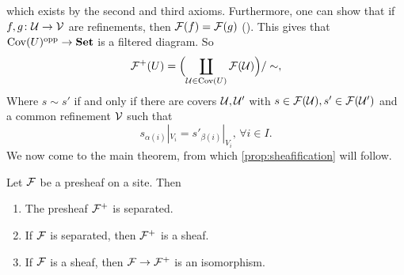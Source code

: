 \documentclass{article}
\DeclareMathOperator{\opp}{opp}
\DeclareMathOperator{\Cov}{Cov}
\begin{document}
which exists by the second and third axioms.
Furthermore, one can show that if $f,g\colon \mathcal{U} \to \mathcal{V}$
are refinements, then $\mathcal{F}(f) = \mathcal{F}(g)$ (\cite[Lemma 7.10.6]{stacks-project}).
This gives that $\Cov(U)^{\opp} \to \Set$ is a filtered
diagram. So
\begin{equation*}
    \mcF^+(U) =\Bigl( \coprod\limits_{\mcU \in \Cov(U)} \mcF(\mcU)\Bigr)/ \sim,
\end{equation*}
Where $s \sim s'$ if and only if there are covers $\mathcal{U}, \mathcal{U}'$ with
$s\in \mathcal{F}(\mathcal{U}), s' \in \mathcal{F}(\mathcal{U}')$ and a common refinement $\mathcal{V}$ such that
\begin{equation*}
    s_{\alpha(i)}|_{V_i} = s'_{\beta(i)}|_{V_i}, \, \forall i\in I.
\end{equation*}
We now come to the main theorem, from which
\cref{prop:sheafification} will follow.
\begin{theorem}
    Let $\mathcal{F}$ be a presheaf on a site. Then
    \begin{enumerate}
        \item The presheaf $\mathcal{F}^+$ is separated.
        \item If $\mathcal{F}$ is separated, then $\mathcal{F}^+$ is a sheaf.
        \item If $\mathcal{F}$ is a sheaf, then $\mathcal{F} \to \mathcal{F}^+$ is an isomorphism.
    \end{enumerate}
\end{theorem}
\end{document}
